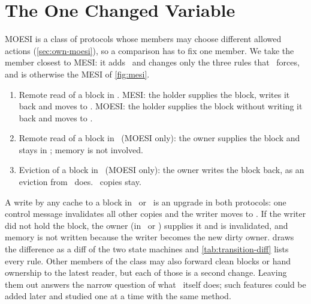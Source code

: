 \section{The One Changed Variable}
\label{sec:method-delta}
%

MOESI is a class of protocols whose members may choose different allowed actions
(\cref{sec:own-moesi}), so a comparison has to fix one member. We take the member
closest to MESI: it adds \stO\ and changes only the three rules that \stO\ forces,
and is otherwise the MESI of \cref{fig:mesi}.
\begin{enumerate}[itemsep=1pt]
  \item Remote read of a block in \stM. MESI: the holder supplies the block,
    writes it back and moves to \stS. MOESI: the holder supplies the block without
    writing it back and moves to \stO.
  \item Remote read of a block in \stO\ (MOESI only): the owner supplies the block
    and stays in \stO; memory is not involved.
  \item Eviction of a block in \stO\ (MOESI only): the owner writes the block back,
    as an eviction from \stM\ does. \stS\ copies stay.
\end{enumerate}
A write by any cache to a block in \stO\ or \stS\ is an upgrade in both protocols:
one control message invalidates all other copies and the writer moves to \stM. If
the writer did not hold the block, the owner (in \stM\ or \stO) supplies it and is
invalidated, and memory is not written because the writer becomes the new dirty
owner.  draws the difference as a diff of the two state
machines and \cref{tab:transition-diff} lists every rule. Other members of the
class may also forward clean blocks or hand ownership to the latest reader, but
each of those is a second change. Leaving them out answers the narrow question of
what \stO\ itself does; such features could be added later and studied one at a
time with the same method.

